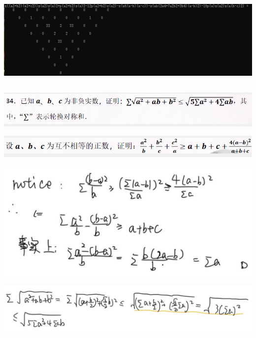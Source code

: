 \documentclass[UTF8]{ctexart}
\begin{document}
\begin{center}
	\includegraphics[width=0.9\linewidth]{a05}
\end{center}
\subsection{}
\begin{center}
	\includegraphics[width=0.7\linewidth]{a06}
\end{center}
\begin{center}
	\includegraphics[width=0.7\linewidth]{a07}
\end{center}
\begin{center}
	\includegraphics[width=0.7\linewidth]{a08}
\end{center}
\begin{center}
	\includegraphics[width=0.7\linewidth]{a09}
\end{center}
\end{document}
